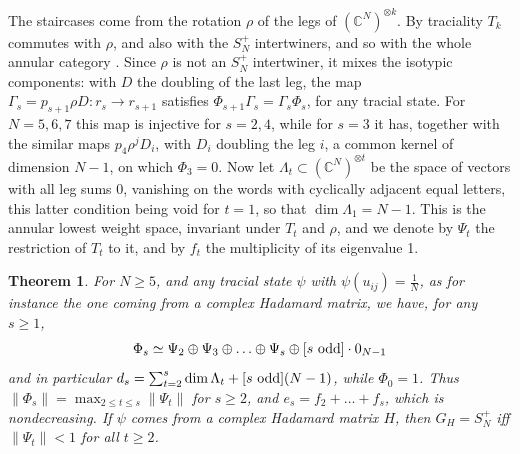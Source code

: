 \documentclass[11pt]{amsart}
\newtheorem{theorem}{Theorem}[section]
\begin{document}
The staircases come from the rotation $\rho$ of the legs of $(\mathbb C^N)^{\otimes k}$. By traciality $T_k$ commutes with $\rho$, and also with the $S_N^+$ intertwiners, and so with the whole annular category \cite{jo2}. Since $\rho$ is not an $S_N^+$ intertwiner, it mixes the isotypic components: with $D$ the doubling of the last leg, the map $\Gamma_s=p_{s+1}\rho D:r_s\to r_{s+1}$ satisfies $\Phi_{s+1}\Gamma_s=\Gamma_s\Phi_s$, for any tracial state. For $N=5,6,7$ this map is injective for $s=2,4$, while for $s=3$ it has, together with the similar maps $p_4\rho^jD_i$, with $D_i$ doubling the leg $i$, a common kernel of dimension $N-1$, on which $\Phi_3=0$. Now let $\Lambda_t\subset(\mathbb C^N)^{\otimes t}$ be the space of vectors with all leg sums 0, vanishing on the words with cyclically adjacent equal letters, this latter condition being void for $t=1$, so that $\dim\Lambda_1=N-1$. This is the annular lowest weight space, invariant under $T_t$ and $\rho$, and we denote by $\Psi_t$ the restriction of $T_t$ to it, and by $f_t$ the multiplicity of its eigenvalue 1.

\begin{theorem}\label{thm:annular}
For $N\geq5$, and any tracial state $\psi$ with $\psi(u_{ij})=\frac{1}{N}$, as for instance the one coming from a complex Hadamard matrix, we have, for any $s\geq1$,
$$\Phi_s\simeq\Psi_2\oplus\Psi_3\oplus\ldots\oplus\Psi_s\oplus[s\ {\rm odd}]\cdot0_{N-1}$$
and in particular $d_s=\sum_{t=2}^s\dim\Lambda_t+[s\ {\rm odd}](N-1)$, while $\Phi_0=1$. Thus $\|\Phi_s\|=\max_{2\leq t\leq s}\|\Psi_t\|$ for $s\geq2$, and $e_s=f_2+\ldots+f_s$, which is nondecreasing. If $\psi$ comes from a complex Hadamard matrix $H$, then $G_H=S_N^+$ iff $\|\Psi_t\|<1$ for all $t\geq2$.
\end{theorem}
\end{document}
